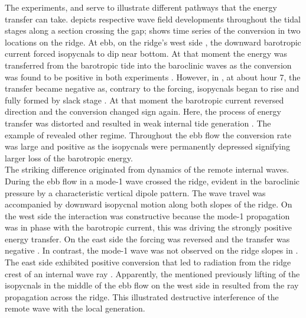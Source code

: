 \documentclass[12pt]{article}
\begin{document}
The experiments,  and  serve to illustrate different pathways that the 
energy transfer can take.  
depicts respective wave field developments 
throughout the tidal stages along a section crossing the gap;  
shows time series of the 
conversion in two locations on the ridge. At ebb, on the ridge's west side 
, the downward barotropic current forced isopycnals 
to 
dip near bottom. 
At that moment the energy was transferred from the barotropic tide into the baroclinic waves as the 
conversion was found to be positive in 
both experiments . However, in , at about hour 7, the transfer 
became 
negative as, 
contrary to the forcing, isopycnals began to rise and fully formed by slack stage 
. At that moment the barotropic current reversed direction and the 
conversion changed sign again. Here, the process of energy transfer was distorted and resulted 
in weak internal tide generation 
. 
The example of  revealed other regime. Throughout the ebb flow the conversion rate was  
large and positive as the isopycnals were permanently depressed signifying larger loss of the 
barotropic energy.\\

The striking difference originated from dynamics of the remote internal waves. During the ebb flow 
in  a mode-1 wave crossed the ridge, evident in the 
baroclinic pressure by a characteristic vertical dipole pattern. The wave travel was accompanied by 
downward isopycnal motion along both slopes of the ridge. On the west side the interaction was 
constructive because the mode-1 propagation was in phase with the barotropic current, this 
was driving the strongly positive energy transfer. On the east side the forcing was reversed and 
the transfer was negative . In contrast, the mode-1 wave 
was not observed on the ridge slopes in . The east side exhibited positive conversion 
that led to radiation  from the ridge crest of an internal wave ray . Apparently, the mentioned previously lifting of the isopycnals in the middle of the 
ebb flow on the west side in  resulted from the ray propagation across the ridge. This 
illustrated destructive interference of the remote wave with the local generation.\\
\end{document}
